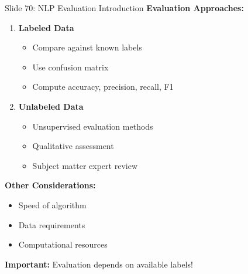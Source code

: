 \documentclass[8pt]{beamer}
\begin{document}
	\begin{frame}{Slide 70: NLP Evaluation Introduction}
		\fontsize{6.5}{7.5}\selectfont
		\textbf{Evaluation Approaches:}
		\begin{enumerate}
			\item \textbf{Labeled Data}
			\begin{itemize}
				\item Compare against known labels
				\item Use confusion matrix
				\item Compute accuracy, precision, recall, F1
			\end{itemize}
			\item \textbf{Unlabeled Data}
			\begin{itemize}
				\item Unsupervised evaluation methods
				\item Qualitative assessment
				\item Subject matter expert review
			\end{itemize}
		\end{enumerate}
		
		\vspace{0.1cm}
		\textbf{Other Considerations:}
		\begin{itemize}
			\item Speed of algorithm
			\item Data requirements
			\item Computational resources
		\end{itemize}
		
		\textcolor{myblue}{\textbf{Important:}} Evaluation depends on available labels!
	\end{frame}
	
	
\end{document}
